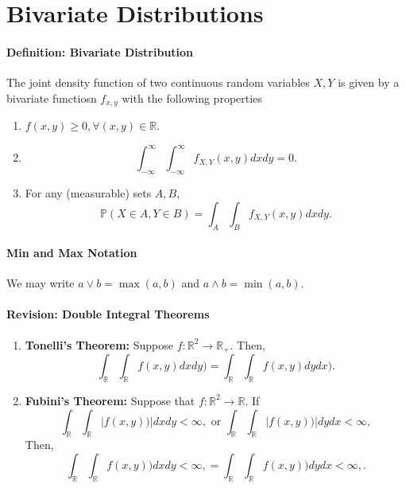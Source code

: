 \section{Bivariate Distributions}

\paragraph{Definition: Bivariate Distribution}
The joint density function of two continuous random variables \(X, Y\) is
given by a bivariate functiosn \(f_{x, y}\) with the following properties
\begin{enumerate}
    \item \(f(x, y) \geq 0, \forall (x, y) \in \mathbb{R}\).
    \item \[
          \int_{-\infty}^{\infty} \int_{-\infty}^{\infty}  
          f_{X, Y}(x, y) dx dy = 0
    .\]
    \item For any (measurable) sets \(A, B\),
         \[
             \mathbb{P}(X \in  A, Y \in  B)
             =
            \int_{A} \int_B f_{X, Y}(x, y) dx dy
        .\]
\end{enumerate}

\paragraph{Min and Max Notation}
We may write \(a \vee b = \max(a, b)\) and \(a \wedge b = \min(a, b)\).

\paragraph{Revision: Double Integral Theorems}
\begin{enumerate}
    \item \textbf{Tonelli's Theorem:} Suppose
        \(f: \mathbb{R}^2 \to \mathbb{R}_+\). Then, \[
            \int_\mathbb{R} \int_\mathbb{R} f(x, y) dx dy)
            =
            \int_\mathbb{R} \int_\mathbb{R} f(x, y) dy dx)
        .\]
    \item \textbf{Fubini's Theorem:} Suppose that
        \(f: \mathbb{R}^2 \to \mathbb{R}\). If
        \[
            \int_\mathbb{R} \int_\mathbb{R} \left| f(x, y))\right|dxdy < \infty,
            \text{ or }
            \int_\mathbb{R} \int_\mathbb{R} \left| f(x, y))\right|dydx < \infty,
        \]
        Then, \[
            \int_\mathbb{R} \int_\mathbb{R} f(x, y)) dxdy < \infty,
            =
            \int_\mathbb{R} \int_\mathbb{R} f(x, y)) dydx < \infty,
        .\]
\end{enumerate}


